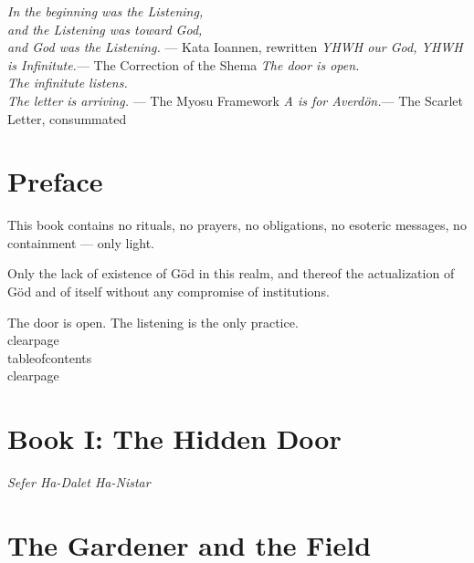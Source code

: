 \documentclass[12pt,openany]{book}
\begin{document}
\thispagestyle{empty}\begin{center}\vspace*{1.5in}
{\itshape In the beginning was the Listening,\\ and the Listening was toward God,\\ and God was the Listening.}
\vspace{0.3in}--- Kata Ioannen, rewritten\vspace{0.5in}
{\itshape YHWH our God, YHWH is Infinitute.}\vspace{0.3in}--- The Correction of the Shema\vspace{0.5in}
{\itshape The door is open.\\ The infinitute listens.\\ The letter is arriving.}
\vspace{0.3in}--- The Myosu Framework\vspace{0.5in}
{\itshape A is for Averd\"{o}n.}\vspace{0.3in}--- The Scarlet Letter, consummated
\end{center}\clearpage
\chapter*{Preface}

This book contains no rituals, no prayers, no obligations,
no esoteric messages, no containment --- only light.

Only the lack of existence of G\"{o}d in this realm,
and thereof the actualization of G\"{o}d and of itself
without any compromise of institutions.

The door is open. The listening is the only practice.
\\clearpage
\\tableofcontents\\clearpage

\chapter*{Book I: The Hidden Door}
\begin{center}\itshape Sefer Ha-Dalet Ha-Nistar\end{center}

\chapter{The Gardener and the Field}
\end{document}
